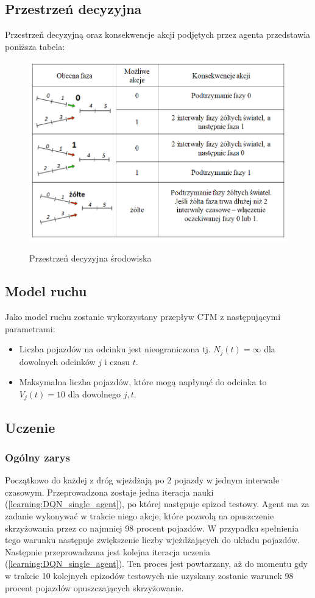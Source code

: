 \documentclass[12pt]{book}
\theoremstyle{plain}
\newcommand{\myref}[1]{(\ref{#1})}
\begin{document}
\subsection{Przestrzeń decyzyjna}
Przestrzeń decyzyjną oraz konsekwencje akcji podjętych przez agenta przedstawia poniższa tabela:
\begin{figure}[H]
	\centering
	\includegraphics[width=16cm]{images/env_14_akcje_italic}
	\label{fig:env_14_akcje}
	\caption{Przestrzeń decyzyjna środowiska}
\end{figure} \noindent

\subsection{Model ruchu}
Jako model ruchu zostanie wykorzystany przepływ CTM z następującymi parametrami:
\begin{itemize}
	\item Liczba pojazdów na odcinku jest nieograniczona tj. $N_j(t)=\infty$ dla dowolnych odcinków $j$ i czasu $t$.
	\item Maksymalna liczba pojazdów, które mogą napłynąć do odcinka to $V_j(t)=10$ dla dowolnego $j,t$.
\end{itemize}

\subsection{Uczenie}
\subsubsection{Ogólny zarys}
Początkowo do każdej z dróg wjeżdżają po 2 pojazdy w jednym interwale czasowym. Przeprowadzona zostaje jedna iteracja nauki \myref{learning:DQN_single_agent}, po której następuje epizod testowy. Agent ma za zadanie wykonywać w trakcie niego akcje, które pozwolą na opuszczenie skrzyżowania przez co najmniej 98 procent pojazdów. W przypadku spełnienia tego warunku następuje zwiększenie liczby wjeżdżających do układu pojazdów. Następnie przeprowadzana jest kolejna iteracja uczenia \myref{learning:DQN_single_agent}. Ten proces jest powtarzany, aż do momentu gdy w trakcie 10 kolejnych epizodów testowych nie uzyskany zostanie warunek 98 procent pojazdów opuszczających skrzyżowanie. 
\end{document}
